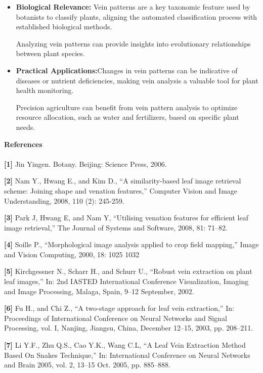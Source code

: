 \documentclass{report}
\begin{document}
{\begin{itemize}
    Better Generalization: Extracting and using vein patterns helps the model generalize better across different plant species, leading to more accurate predictions.
    \item \textbf{Biological Relevance:} Vein patterns are a key taxonomic feature used by botanists to classify plants, aligning the automated classification process with established biological methods.
    
    Analyzing vein patterns can provide insights into evolutionary relationships between plant species.
    \item \textbf{Practical Applications:}Changes in vein patterns can be indicative of diseases or nutrient deficiencies, making vein analysis a valuable tool for plant health monitoring.
    
    Precision agriculture can benefit from vein pattern analysis to optimize resource allocation, such as water and fertilizers, based on specific plant needs.
\end{itemize}
\vspace{3cm}
\begin{justify}
\textbf{\Huge References}
\\ \\
\textbf{[1]} Jin Yingen. Botany. Beijing: Science Press, 2006.

\textbf{[2]} Nam Y., Hwang E., and Kim D., “A similarity-based leaf image retrieval scheme: Joining shape and venation features,” Computer Vision and Image Understanding, 2008, 110 (2): 245-259.

\textbf{[3]} Park J, Hwang E, and Nam Y, “Utilising venation features for efficient leaf image retrieval,” The Journal of Systems and Software, 2008, 81: 71–82.

\textbf{[4]} Soille P., “Morphological image analysis applied to crop field mapping,” Image and Vision Computing, 2000, 18: 1025 1032

\textbf{[5]} Kirchgessner N., Scharr H., and Schurr U., “Robust vein extraction on plant leaf images,” In: 2nd IASTED International Conference Visualization, Imaging and Image Processing, Malaga, Spain, 9–12 September, 2002.

\textbf{[6]} Fu H., and Chi Z., “A two-stage approach for leaf vein extraction,” In: Proceedings of International Conference on Neural Networks and Signal Processing, vol. I, Nanjing, Jiangsu, China, December 12–15, 2003, pp. 208–211.

\textbf{[7]} Li Y.F., Zhu Q.S., Cao Y.K., Wang C.L, “A Leaf Vein Extraction Method Based On Snakes Technique,” In: International Conference on Neural Networks and Brain 2005, vol. 2, 13–15 Oct. 2005, pp. 885–888.


\end{justify}}
\end{document}
